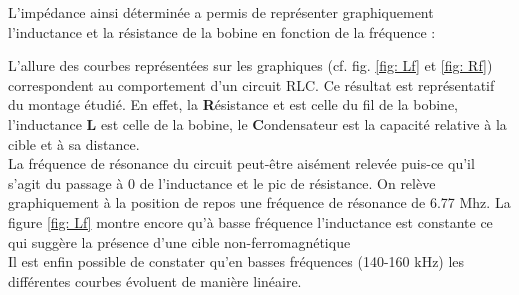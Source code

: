 L'impédance ainsi déterminée a permis de représenter graphiquement l'inductance et la résistance de 
la bobine en fonction de la fréquence :



L'allure des courbes représentées sur les graphiques (cf. fig. \ref{fig: Lf} et \ref{fig: Rf})
correspondent au comportement d'un circuit RLC. Ce résultat est représentatif du montage étudié.
En effet, la \textbf{R}ésistance et est celle du fil de la bobine, l'inductance \textbf{L} est celle 
de la bobine, le \textbf{C}ondensateur est la capacité relative à la 
cible et à sa distance.\\

La fréquence de résonance du circuit peut-être aisément relevée puis-ce qu'il s'agit du passage à 0 
de l'inductance et le pic de résistance. On relève graphiquement à la 
position de repos une fréquence de résonance de 6.77 Mhz. La figure \ref{fig: Lf} montre encore
qu'à basse fréquence l'inductance est constante ce qui suggère la présence d'une cible non-ferromagnétique\\





Il est enfin possible de constater qu'en basses fréquences (140-160 kHz) les différentes courbes évoluent
de manière linéaire. \\





